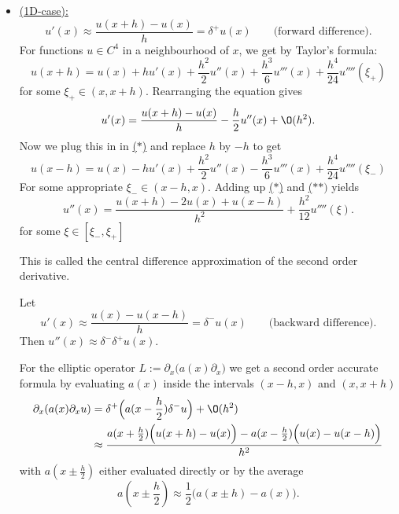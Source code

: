 \begin{itemize}
	\item \underline{(1D-case):} 
		\[
			u'(x) \approx \frac{u(x+h)-u(x)}{h} = \delta^{+}u(x) \qquad \text{(forward difference)}
		.\] 
		For functions $u \in C^{4}$ in a neighbourhood of $x$, we get by Taylor's formula:
		\begin{equation} \label{eq:eq_3} \tag{$\ast$}
			u(x+h) = u(x) + h u'(x) + \frac{h^{2}}{2} u''(x) + \frac{h^{3}}{6}u'''(x) + \frac{h^{4}}{24}u''''(\xi_{+})	
		\end{equation}
		for some $\xi_{+} \in (x, x+h)$. Rearranging the equation gives
		\[
			u'(x) = \frac{u(x+h)-u(x)}{h}-\frac{h}{2}u''(x) + \O(h^{2})
		.\] 
		Now we plug this in in \href{eq:eq_4}{($\ast$)} and replace $h$ by $-h$ to get
		\begin{equation} \label{eq:eq_4} \tag{$\ast \ast$}
			u(x-h) = u(x) - hu'(x) + \frac{h^{2}}{2}u''(x)- \frac{h^{3}}{6} u'''(x) + \frac{h^{4}}{24}u''''(\xi _{-})
		\end{equation}
		For some appropriate $\xi _{-} \in (x-h, x)$.
		Adding up \href{eq:eq_3}{($\ast$)} and \href{eq:eq_4}{($\ast \ast)$} yields
		\[
			u''(x)= \frac{u(x+h) - 2u(x) + u(x-h)}{h^{2}} + \frac{h^{2}}{12}u''''(\xi )
		.\] for some $\xi  \in [\xi _{-}, \xi _{+}]$

		This is called the central difference approximation of the second order derivative.
		
		Let
		\[
			u'(x) \approx \frac{u(x)-u(x-h)}{h} = \delta^{-}u(x) \qquad \text{(backward difference)}
		.\] Then $u''(x) \approx \delta^{-}\delta^{+}u(x)$.

		For the elliptic operator $L:=\partial_{x} \Big(a(x)\partial_{x}\Big)$ we get a second order accurate formula by evaluating $a(x)$ inside the intervals $(x-h, x)$ and $(x, x+h)$
		\begin{align*}
			\partial_{x}(a(x) \partial_{x}u) &=
			\delta^{+}\Big(a(x- \frac{h}{2}) \delta^{-} u\Big) + \O(h^{2}) \\
											 &\approx \frac{a(x+\frac{h}{2})\Big(u(x+h)-u(x)\Big)-a(x-\frac{h}{2})\Big(u(x)-u(x-h)\Big)}{h^{2}}
		\end{align*}
		with $a(x \pm \frac{h}{2})$ either evaluated directly or by the average
		\[
			a(x \pm \frac{h}{2}) \approx \frac{1}{2}\Big(a(x \pm h) - a(x)\Big)
		.\] 
		

\end{itemize}

